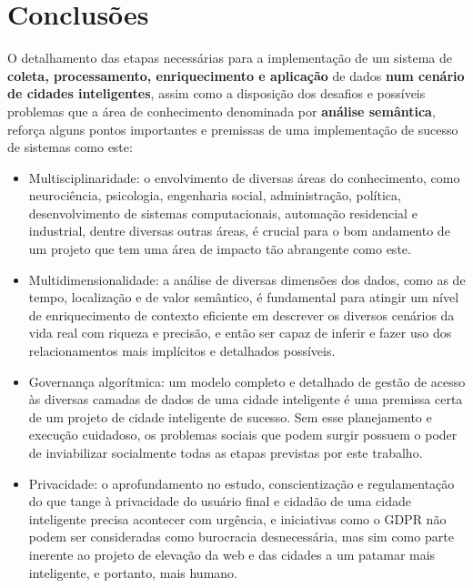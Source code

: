 \chapter{Conclusões} \label{c:conclusao}

O detalhamento das etapas necessárias para a implementação de um sistema de \textbf{coleta, processamento, enriquecimento e aplicação} de dados \textbf{num cenário de cidades inteligentes}, assim como a disposição dos desafios e possíveis problemas que a área de conhecimento denominada por \textbf{análise semântica}, reforça alguns pontos importantes e premissas de uma implementação de sucesso de sistemas como este:

\begin{itemize}
    \item Multisciplinaridade: o envolvimento de diversas áreas do conhecimento, como neurociência, psicologia, engenharia social, administração, política, desenvolvimento de sistemas computacionais, automação residencial e industrial, dentre diversas outras áreas, é crucial para o bom andamento de um projeto que tem uma área de impacto tão abrangente como este.
    \item Multidimensionalidade: a análise de diversas dimensões dos dados, como as de tempo, localização e de valor semântico, é fundamental para atingir um nível de enriquecimento de contexto eficiente em descrever os diversos cenários da vida real com riqueza e precisão, e então ser capaz de inferir e fazer uso dos relacionamentos mais implícitos e detalhados possíveis.
    \item Governança algorítmica: um modelo completo e detalhado de gestão de acesso às diversas camadas de dados de uma cidade inteligente é uma premissa certa de um projeto de cidade inteligente de sucesso. Sem esse planejamento e execução cuidadoso, os problemas sociais que podem surgir possuem o poder de inviabilizar socialmente todas as etapas previstas por este trabalho.
    \item Privacidade: o aprofundamento no estudo, conscientização e regulamentação do que tange à privacidade do usuário final e cidadão de uma cidade inteligente precisa acontecer com urgência, e iniciativas como o GDPR não podem ser consideradas como burocracia desnecessária, mas sim como parte inerente ao projeto de elevação da web e das cidades a um patamar mais inteligente, e portanto, mais humano.
\end{itemize}